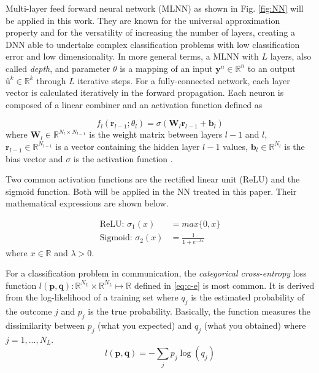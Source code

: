 \documentclass[conference]{IEEEtran}
\begin{document}
Multi-layer feed forward neural network (MLNN) as shown in Fig. \ref{fig:NN} will be applied in this work. They are known for the universal approximation property \cite{Ibnkahla} and for the versatility of increasing the number of layers, creating a DNN able to undertake complex classification problems with low classification error and low dimensionality. In more general terms, a MLNN with $L$ layers, also called \textit{depth}, and parameter $\theta$ is a mapping of an input $\textbf{y}^n \in \mathbb{R}^{n}$ to an output $\textbf{û}^k \in \mathbb{R}^{k}$ through $L$ iterative steps. For a fully-connected network, each layer vector is calculated iteratively in the forward propagation. Each neuron is composed of a linear combiner and an activation function defined as 

\begin{equation}\label{eq:eqFP}
	f_{l}\left( \textbf{r}_{l-1};\theta _{l}\right) = \sigma \left( \textbf{W}_{l}\textbf{r}_{l-1}+\textbf{b}_{l}\right)
\end{equation}
where $\textbf{W}_{l}\in \mathbb{R} ^{N_{l}\times N_{l-1}}$ is the weight matrix between layers $l-1$ and $l$, $\textbf{r}_{l-1} \in \mathbb{R} ^{N_{l-1}}$ is a vector containing the hidden layer $l-1$ values, $\textbf{b}_{l}\in \mathbb{R} ^{N_l}$ is the bias vector and $\sigma$ is the activation function \cite{DBLP:journals/corr/OSheaH17}.

%
Two common activation functions are the rectified linear unit (ReLU) and the sigmoid function. Both will be applied in the NN treated in this paper. Their mathematical expressions are shown below.

\begin{align}
	\text{ReLU: } \sigma_1 (x)& = max\{0, x\} \label{eq:relu}\\ 
	\text{Sigmoid: } \sigma_2 (x)& = \frac{1}{1+e^{- \lambda x}} \label{eq:sig}
\end{align}
where $x \in \mathbb{R}$ and $\lambda>0$.

For a classification problem in communication, the \textit{categorical cross-entropy} loss function $l(\textbf{p},\textbf{q}):\mathbb{R} ^{N_L}\times \mathbb{R} ^{N_L}\mapsto \mathbb{R}$ defined in \eqref{eq:c-e} is most common. It is derived from the log-likelihood of a training set where $q_j$ is the estimated probability of the outcome $j$ and $p_{j}$ is the true probability. Basically, the function measures the dissimilarity between $p_{j}$ (what you expected) and $q_{j}$ (what you obtained) \cite{murphy2013machine} where $j=1,...,N_L$.
\begin{equation}\label{eq:c-e}
	l(\textbf{p},\textbf{q})=-\sum _{j}p_{j}\log \left( q_{j}\right)
\end{equation}
\end{document}

